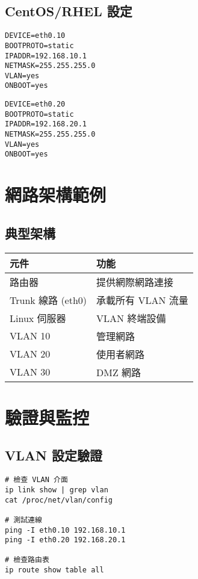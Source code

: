 \documentclass[12pt,a4paper]{article}
\begin{document}
\subsection{CentOS/RHEL 設定}

\begin{lstlisting}[caption=ifcfg-eth0.10]
DEVICE=eth0.10
BOOTPROTO=static
IPADDR=192.168.10.1
NETMASK=255.255.255.0
VLAN=yes
ONBOOT=yes
\end{lstlisting}

\begin{lstlisting}[caption=ifcfg-eth0.20]
DEVICE=eth0.20
BOOTPROTO=static
IPADDR=192.168.20.1
NETMASK=255.255.255.0
VLAN=yes
ONBOOT=yes
\end{lstlisting}

\section{網路架構範例}

\subsection{典型架構}

\begin{center}
\begin{tabular}{|l|l|}
\hline
\textbf{元件} & \textbf{功能} \\
\hline
路由器 & 提供網際網路連接 \\
\hline
Trunk 線路 (eth0) & 承載所有 VLAN 流量 \\
\hline
Linux 伺服器 & VLAN 終端設備 \\
\hline
VLAN 10 & 管理網路 \\
\hline
VLAN 20 & 使用者網路 \\
\hline
VLAN 30 & DMZ 網路 \\
\hline
\end{tabular}
\end{center}

\section{驗證與監控}

\subsection{VLAN 設定驗證}

\begin{lstlisting}[caption=檢查 VLAN 設定]
# 檢查 VLAN 介面
ip link show | grep vlan
cat /proc/net/vlan/config

# 測試連線
ping -I eth0.10 192.168.10.1
ping -I eth0.20 192.168.20.1

# 檢查路由表
ip route show table all
\end{lstlisting}
\end{document}
